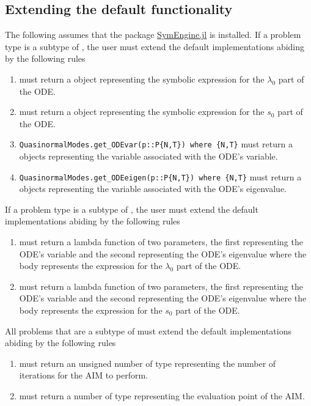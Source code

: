 \subsection{Extending the default functionality}

The following assumes that the package \href{https://github.com/symengine/SymEngine.jl}{SymEngine.jl} is installed. If a problem type  is a subtype of , the user must extend the default implementations abiding by the following rules
%
\begin{enumerate}
  \item {} must return a  object representing the symbolic expression for the $\lambda_0$ part of the ODE.
  \item {} must return a  object representing the symbolic expression for the $s_0$ part of the ODE.
  \item \texttt{QuasinormalModes.get\_ODEvar(p::P\{N,T\}) where \{N,T\}} must return a  objects representing the  variable associated with the ODE's variable.
  \item \texttt{QuasinormalModes.get\_ODEeigen(p::P\{N,T\}) where \{N,T\}} must return a  objects representing the  variable associated with the ODE's eigenvalue.
\end{enumerate}

If a problem type  is a subtype of , the user must extend the default implementations abiding by the following rules
%
\begin{enumerate}
  \item {} must return a lambda function of two parameters, the first representing the ODE's variable and the second representing the ODE's eigenvalue where the body represents the expression for the $\lambda_0$ part of the ODE.
  \item {} must return a lambda function of two parameters, the first representing the ODE's variable and the second representing the ODE's eigenvalue where the body represents the expression for the $s_0$ part of the ODE.
\end{enumerate}

All problems  that are a subtype of  must extend the default implementations abiding by the following rules
%
\begin{enumerate}
  \item {} must return an unsigned number of type  representing the number of iterations for the AIM to perform.
  \item {} must return a number of type  representing the evaluation point of the AIM.
\end{enumerate}

